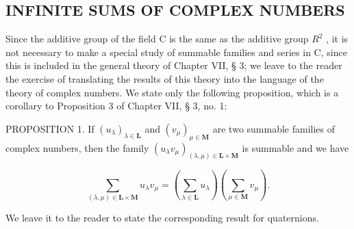 \subsection{INFINITE SUMS OF COMPLEX NUMBERS}

Since the additive group of the field C is the same as the additive group \(R^{2}\) , it is not necessary to make a special study of summable families and series in C, since this is included in the general theory of Chapter VII, § 3; we leave to the reader the exercise of translating the results of this theory into the language of the theory of complex numbers. We state only the following proposition, which is a corollary to Proposition 3 of Chapter VII, § 3, no. 1:

PROPOSITION 1. If \((u_{\lambda})_{\lambda \in \mathbf{L}}\) and \((v_{\mu})_{\mu \in \mathbf{M}}\) are two summable families of complex numbers, then the family \((u_{\lambda}v_{\mu})_{(\lambda ,\mu)\in \mathbf{L}\times \mathbf{M}}\) is summable and we have

\[
\sum_ {(\lambda , \mu) \in \mathbf {L} \times \mathbf {M}} u _ {\lambda} v _ {\mu} = \left(\sum_ {\lambda \in \mathbf {L}} u _ {\lambda}\right) \left(\sum_ {\mu \in \mathbf {M}} v _ {\mu}\right).\tag{1}
\]

We leave it to the reader to state the corresponding result for quaternions.

